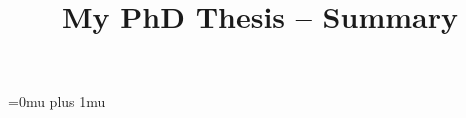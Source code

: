 \documentclass{template/thesis.cs.pub.ro}
\begin{document}



\title{My PhD Thesis -- Summary}

\begin{frontmatter} %



\setcounter{tocdepth}{1}


\end{frontmatter} %



\Urlmuskip=0mu plus 1mu\relax




\end{document}

